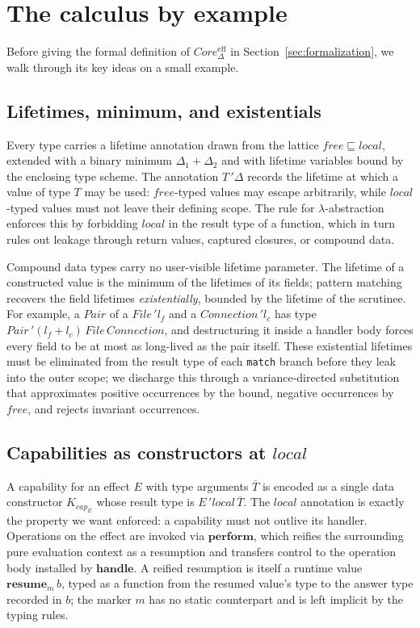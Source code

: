 \documentclass[12pt,a4paper]{article}
\newcommand{\keyword}[1]{\mathbf{#1}}
\begin{document}
    \section{The calculus by example} \label{sec:calculus-example}

    Before giving the formal definition of $Core_\Delta^{\mathrm{eff}}$ in
    Section~\ref{sec:formalization}, we walk through its key ideas on a small
    example.

    \subsection{Lifetimes, minimum, and existentials}

    Every type carries a lifetime annotation drawn from the lattice
    $free \sqsubseteq local$, extended with a binary minimum $\Delta_1 + \Delta_2$
    and with lifetime variables bound by the enclosing type scheme.
    The annotation $T\,'\!\Delta$ records the lifetime at which a value of type $T$
    may be used: $free$-typed values may escape arbitrarily, while $local$-typed
    values must not leave their defining scope.
    The rule for $\lambda$-abstraction enforces this by forbidding $local$ in the
    result type of a function, which in turn rules out leakage through return
    values, captured closures, or compound data.

    Compound data types carry no user-visible lifetime parameter.
    The lifetime of a constructed value is the minimum of the lifetimes of its
    fields; pattern matching recovers the field lifetimes \emph{existentially},
    bounded by the lifetime of the scrutinee.
    For example, a $Pair$ of a $File\,'\!l_f$ and a $Connection\,'\!l_c$ has type
    $Pair\,'(l_f + l_c)\,File\,Connection$, and destructuring it inside a handler
    body forces every field to be at most as long-lived as the pair itself.
    These existential lifetimes must be eliminated from the result type of each
    \texttt{match} branch before they leak into the outer scope; we discharge
    this through a variance-directed substitution that approximates positive
    occurrences by the bound, negative occurrences by $free$, and rejects
    invariant occurrences.

    \subsection{Capabilities as constructors at $local$}

    A capability for an effect $E$ with type arguments $\overline{T}$ is encoded
    as a single data constructor $K_{cap_E}$ whose result type is
    $E\,'\!local\,\overline{T}$.
    The $local$ annotation is exactly the property we want enforced: a
    capability must not outlive its handler.
    Operations on the effect are invoked via $\keyword{perform}$, which reifies
    the surrounding pure evaluation context as a resumption and transfers
    control to the operation body installed by $\keyword{handle}$.
    A reified resumption is itself a runtime value $\keyword{resume}_m\,b$, typed
    as a function from the resumed value's type to the answer type recorded in $b$;
    the marker $m$ has no static counterpart and is left implicit by the typing
    rules.
\end{document}
